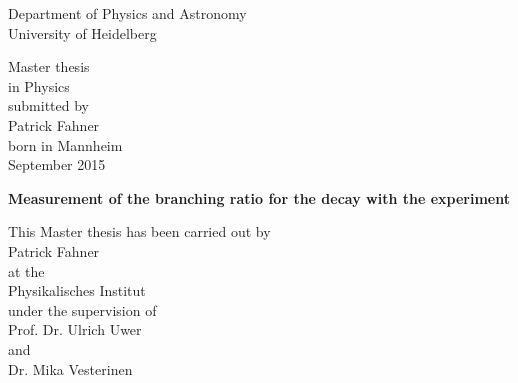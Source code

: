 
\thispagestyle{empty}
\begin{center}
  \renewcommand{\baselinestretch}{2.00}
  \Large\sffamily
  Department of Physics and Astronomy\\
  \large University of Heidelberg
  \par\vfill\normalfont
  Master thesis\\
  in Physics\\
  submitted by\\
  Patrick Fahner\\
  born in Mannheim\\
  September 2015
\end{center}
\cleardoublepage

\thispagestyle{empty}
\begin{center}
  \renewcommand{\baselinestretch}{2.00}
  \Large\bfseries\sffamily
  \boldmath
    Measurement of the branching ratio for the decay \LbToDpmunuX with the \lhcb experiment
  \unboldmath
  \par
  \vfill
  \large\normalfont
  This Master thesis has been carried out by\\
  Patrick Fahner\\
  at the\\
  Physikalisches Institut\\
  under the supervision of\\
  Prof. Dr. Ulrich Uwer\\
  and\\
  Dr. Mika Vesterinen
\end{center}\par

\renewcommand{\baselinestretch}{1.00}\normalsize
